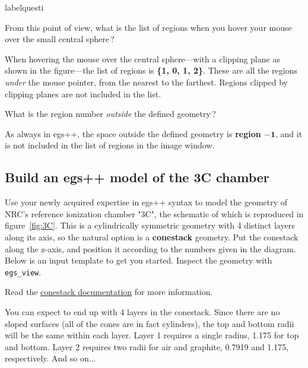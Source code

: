 \documentclass[12pt,twoside]{article}
\makeatletter
\renewcommand\thequesti         {\@arabic\c@questi}
\newenvironment{question}{
    \bfseries
    \edef\@questictr{questi}
    \expandafter
    \list \csname label\@questictr\endcsname {
        \usecounter\@questictr\def\makelabel##1{\hss\llap{##1}}
        \savebox{\questbox}             {\thequesti}
        \setlength\labelsep             {0.6em}
        \setlength\labelwidth           {\wd\questbox}
        \setlength\leftmargini          {\labelwidth}
        \addtolength{\leftmargini}      {\labelsep}
        \addtolength{\leftmargini}      {0.2em}
        \leftmargin\leftmargini
        \setlength\topsep               {1em}
        \setlength\itemsep              {1.2em}
        \setlength\parsep               {0.5em}
    }
}{\normalfont\endlist}
\newenvironment{answer}{\normalfont}{\relax}
\makeatother
\begin{document}
\begin{question}

\item From this point of view, what is the list of regions when you hover your
mouse over the small central sphere\,?

\begin{answer}
When hovering the mouse over the central sphere---with a clipping plane as
shown in the figure---the list of regions is \textbf{\{1, 0, 1, 2\}}. These are
all the regions \textit{under} the mouse pointer, from the nearest to the
farthest. Regions clipped by clipping planes are not included in the list.
\end{answer}

\item What is the region number \textit{outside} the defined geometry\,?

\begin{answer}
As always in egs++, the space outside the defined geometry is \textbf{region
$\mathbf{-1}$}, and it is not included in the list of regions in the image
window.
\end{answer}

\end{question}


\subsection{Build an egs++ model of the 3C chamber}

Use your newly acquired expertise in egs++ syntax to model the geometry of NRC's
reference ionization chamber "3C", the schematic of which is reproduced in
figure~\ref{fig:3C}. This is a cylindrically symmetric geometry with 4 distinct
layers along its axis, so the natural option is a \textbf{conestack} geometry.
Put the conestack along the z-axis, and position it according to the numbers
given in the diagram. Below is an input template to get you started. Inspect
the geometry with \Verb|egs_view|.

Read the \href{http://nrc-cnrc.github.io/EGSnrc/doc/pirs898/classEGS__ConeStack.html}{conestack documentation} for more information.

You can expect to end up with 4 layers in the conestack. Since there are no
sloped surfaces (all of the cones are in fact cylinders), the top and bottom
radii will be the same within each layer. Layer 1 requires a single radius,
1.175 for top and bottom. Layer 2 requires two radii for air and graphite,
0.7919 and 1.175, respectively. And so on...
\end{document}
